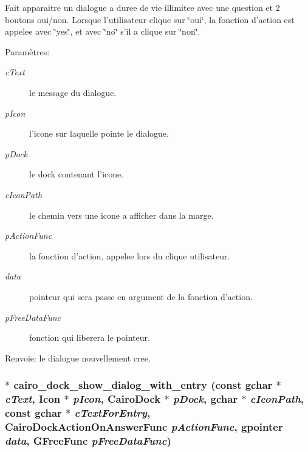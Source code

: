 Fait apparaitre un dialogue a duree de vie illimitee avec une question et 2 boutons oui/non. Lorsque l'utilisateur clique sur \char`\"{}oui\char`\"{}, la fonction d'action est appelee avec \char`\"{}yes\char`\"{}, et avec \char`\"{}no\char`\"{} s'il a clique sur \char`\"{}non\char`\"{}. \begin{Desc}
\item[Param\`{e}tres:]
\begin{description}
\item[{\em c\-Text}]le message du dialogue. \item[{\em p\-Icon}]l'icone sur laquelle pointe le dialogue. \item[{\em p\-Dock}]le dock contenant l'icone. \item[{\em c\-Icon\-Path}]le chemin vers une icone a afficher dans la marge. \item[{\em p\-Action\-Func}]la fonction d'action, appelee lors du clique utilisateur. \item[{\em data}]pointeur qui sera passe en argument de la fonction d'action. \item[{\em p\-Free\-Data\-Func}]fonction qui liberera le pointeur. \end{description}
\end{Desc}
\begin{Desc}
\item[Renvoie:]le dialogue nouvellement cree. \end{Desc}
\subsubsection{$\ast$ cairo\_\-dock\_\-show\_\-dialog\_\-with\_\-entry (const gchar $\ast$ {\em c\-Text}, {\bf Icon} $\ast$ {\em p\-Icon}, {\bf Cairo\-Dock} $\ast$ {\em p\-Dock}, gchar $\ast$ {\em c\-Icon\-Path}, const gchar $\ast$ {\em c\-Text\-For\-Entry}, {\bf Cairo\-Dock\-Action\-On\-Answer\-Func} {\em p\-Action\-Func}, gpointer {\em data}, GFree\-Func {\em p\-Free\-Data\-Func})}\label{cairo-dock-dialogs_8c_b0bd819038a267ea0bc780417037e419}



